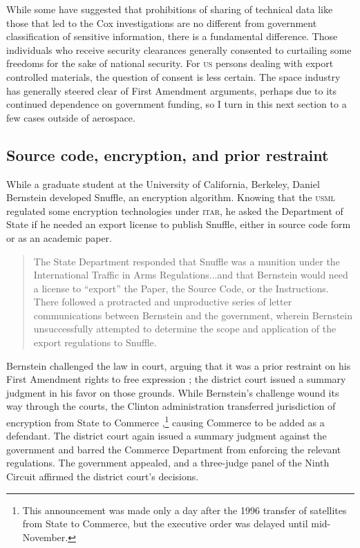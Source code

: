 \documentclass[preprint,twocolumn,5p]{elsarticle}
\begin{document}
While some have suggested that prohibitions of sharing of technical data like those that led to the Cox investigations are no different from government classification of sensitive information, there is a fundamental difference. Those individuals who receive security clearances generally consented to curtailing some freedoms for the sake of national security. For \textsc{us} persons dealing with export controlled materials, the question of consent is less certain. The space industry has generally steered clear of First Amendment arguments, perhaps due to its continued dependence on government funding, so I turn in this next section to a few cases outside of aerospace.

\subsection{Source code, encryption, and prior restraint}
While a graduate student at the University of California, Berkeley, Daniel Bernstein developed Snuffle, an encryption algorithm. Knowing that the \textsc{usml} regulated some encryption technologies under \textsc{itar}, he asked the Department of State if he needed an export license to publish Snuffle, either in source code form or as an academic paper.
\begin{quote}
The State Department responded that Snuffle was a munition under the International Traffic in Arms Regulations...and that Bernstein would need a license to ``export'' the Paper, the Source Code, or the Instructions. There followed a protracted and unproductive series of letter communications between Bernstein and the government, wherein Bernstein unsuccessfully attempted to determine the scope and application of the export regulations to Snuffle. \citep{Bernstein1997}
\end{quote}
%
Bernstein challenged the law in court, arguing that it was a prior restraint on his First Amendment rights to free expression \citep{Bernstein1997}; the district court issued a summary judgment in his favor on those grounds. While Bernstein's challenge wound its way through the courts, the Clinton administration transferred jurisdiction of encryption from State to Commerce \citep{ExecOrder13026_1996},\footnote{This announcement was made only a day after the 1996 transfer of satellites from State to Commerce, but the executive order was delayed until mid-November.} causing Commerce to be added as a defendant. The district court again issued a summary judgment against the government and barred the Commerce Department from enforcing the relevant regulations. The government appealed, and a three-judge panel of the Ninth Circuit affirmed the district court's decisions.
\end{document}
